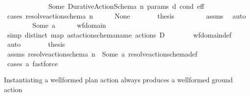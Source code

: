 \begin{isabellebody}
\ \ \ \ \ \ \ \ \ \ \ \ {\isacharequal}{\kern0pt}\ Some\ {\isacharparenleft}{\kern0pt}Durative{\isacharunderscore}{\kern0pt}Action{\isacharunderscore}{\kern0pt}Schema\ n\ params\ d\ cond\ eff{\isacharparenright}{\kern0pt}{\isachardoublequoteclose}\isanewline
%
\isadelimproof
\ \ %
\endisadelimproof
%
\isatagproof
{}\isamarkupfalse%
\ {\isacharparenleft}{\kern0pt}cases\ {\isachardoublequoteopen}resolve{\isacharunderscore}{\kern0pt}action{\isacharunderscore}{\kern0pt}schema\ n{\isachardoublequoteclose}{\isacharparenright}{\kern0pt}\isanewline
\ \ \ \ \isamarkupfalse%
\ None\isanewline
\ \ \ \ \isamarkupfalse%
\ \isamarkupfalse%
\ {\isacharquery}{\kern0pt}thesis\ \isanewline
\ \ \ \ \ \ \isamarkupfalse%
\ assms\ \isamarkupfalse%
\ auto\isanewline
\ \ \isamarkupfalse%
\isanewline
\ \ \ \ \isamarkupfalse%
\ {\isacharparenleft}{\kern0pt}Some\ a{\isacharparenright}{\kern0pt}\isanewline
\ \ \ \ \isamarkupfalse%
\ wf{\isacharunderscore}{\kern0pt}domain\ \isamarkupfalse%
\ {\isacharbrackleft}{\kern0pt}simp{\isacharbrackright}{\kern0pt}{\isacharcolon}{\kern0pt}\ {\isachardoublequoteopen}distinct\ {\isacharparenleft}{\kern0pt}map\ ast{\isacharunderscore}{\kern0pt}action{\isacharunderscore}{\kern0pt}schema{\isachardot}{\kern0pt}name\ {\isacharparenleft}{\kern0pt}actions\ D{\isacharparenright}{\kern0pt}{\isacharparenright}{\kern0pt}{\isachardoublequoteclose}\isanewline
\ \ \ \ \ \ \isamarkupfalse%
\ wf{\isacharunderscore}{\kern0pt}domain{\isacharunderscore}{\kern0pt}def\ \isamarkupfalse%
\ auto\isanewline
\ \ \ \ \isamarkupfalse%
\ \isamarkupfalse%
\ {\isacharquery}{\kern0pt}thesis\ \isanewline
\ \ \ \ \ \ \isamarkupfalse%
\ assms\ {\isacartoucheopen}resolve{\isacharunderscore}{\kern0pt}action{\isacharunderscore}{\kern0pt}schema\ n\ {\isacharequal}{\kern0pt}\ Some\ a{\isacartoucheclose}\ resolve{\isacharunderscore}{\kern0pt}action{\isacharunderscore}{\kern0pt}schema{\isacharunderscore}{\kern0pt}def\isanewline
\ \ \ \ \ \ \isamarkupfalse%
\ {\isacharparenleft}{\kern0pt}cases\ a{\isacharparenright}{\kern0pt}\ fastforce{\isacharplus}{\kern0pt}\isanewline
\ \ \isamarkupfalse%
%
\endisatagproof
{\isafoldproof}%
%
\isadelimproof
%
\endisadelimproof
%
\begin{isamarkuptext}%
Instantiating a wellformed plan action always produces a wellformed ground action%

\end{isamarkuptext}
\end{isabellebody}
